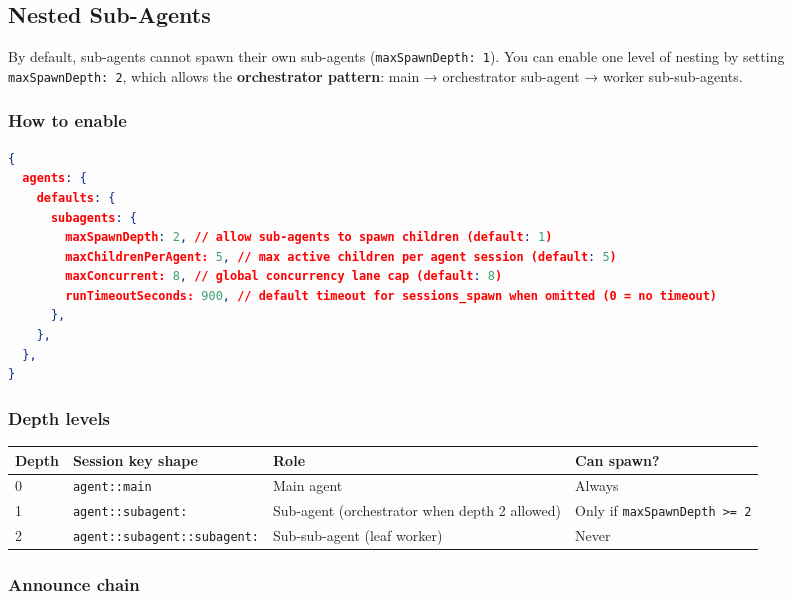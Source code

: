 \subsection{Nested Sub-Agents}


By default, sub-agents cannot spawn their own sub-agents (\texttt{maxSpawnDepth: 1}). You can enable one level of nesting by setting \texttt{maxSpawnDepth: 2}, which allows the \textbf{orchestrator pattern}: main → orchestrator sub-agent → worker sub-sub-agents.

\subsubsection{How to enable}


\begin{lstlisting}[language=json]
{
  agents: {
    defaults: {
      subagents: {
        maxSpawnDepth: 2, // allow sub-agents to spawn children (default: 1)
        maxChildrenPerAgent: 5, // max active children per agent session (default: 5)
        maxConcurrent: 8, // global concurrency lane cap (default: 8)
        runTimeoutSeconds: 900, // default timeout for sessions_spawn when omitted (0 = no timeout)
      },
    },
  },
}
\end{lstlisting}


\subsubsection{Depth levels}



\begin{table}[h]
\centering
\small
\begin{tabular}{|l|l|l|l|}
\hline
Depth & Session key shape & Role & Can spawn? \\
\hline
0 & \texttt{agent::main} & Main agent & Always \\
\hline
1 & \texttt{agent::subagent:} & Sub-agent (orchestrator when depth 2 allowed) & Only if \texttt{maxSpawnDepth >= 2} \\
\hline
2 & \texttt{agent::subagent::subagent:} & Sub-sub-agent (leaf worker) & Never \\
\hline
\end{tabular}
\end{table}



\subsubsection{Announce chain}


